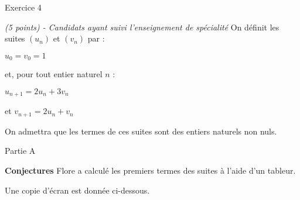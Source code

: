 
%
\begin{h2}Exercice 4\end{h2}
\textit{(5 points) - Candidats ayant  suivi l'enseignement de spécialité}
On définit les suites $\left(u_n\right)$ et $\left(v_n\right)$ par :
\par
$u_0 = v_0 = 1$
\par
et, pour tout entier naturel $n$ :
\par
$u_{n+1} = 2u_n+3v_n $
\par
et $v_{n+1} = 2u_n+v_n$
\par
On admettra que les termes de ces suites sont des entiers naturels non nuls.
\begin{h3}Partie A\end{h3}
\textbf{Conjectures}
Flore a calculé les premiers termes des suites à l'aide d'un tableur.
\par
Une copie d'écran est donnée ci-dessous.

\begin{center}
\end{center}

